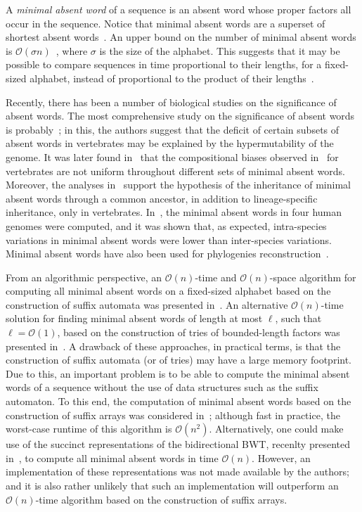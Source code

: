 \documentclass{llncs}
\newcommand{\cO}{\mathcal{O}}
\begin{document}
  A \textit{minimal absent word} of a sequence is an absent word whose proper factors all occur in the sequence.
  Notice that minimal absent words are a superset of shortest absent words~\cite{Pinho2009}. 
  An upper bound on the number of minimal absent words is $\cO(\sigma n)$~\cite{Crochemore98automataand,Mignosi02}, where $\sigma$ is the size of the alphabet.
  This suggests that it may be possible to compare sequences in time proportional to their lengths, for a fixed-sized alphabet, instead of proportional to
  the product of their lengths~\cite{HauboldPMW05}. 
  
  Recently, there has been a number of biological studies on the significance of absent words.
  The most comprehensive study on the significance of absent words is probably~\cite{nullrly}; in this, the authors suggest that the deficit of certain subsets of absent words 
  in vertebrates may be explained by the hypermutability of the genome. It was later found in~\cite{minabpro} that the compositional biases observed in~\cite{nullrly} for vertebrates 
  are not uniform throughout different sets of minimal absent words. Moreover, the analyses in~\cite{minabpro} support the hypothesis of the inheritance of minimal absent words through a common ancestor, 
  in addition to lineage-specific inheritance, only in vertebrates. In~\cite{citeulike:10180507}, the minimal absent words in four human genomes were computed, and it was shown that, as expected, 
  intra-species variations in minimal absent words were lower than inter-species variations. Minimal absent words have also been used for phylogenies reconstruction~\cite{Chairungsee2012109}.
  
  From an algorithmic perspective, an $\cO(n)$-time and $\cO(n)$-space algorithm for computing all minimal absent words on a fixed-sized alphabet based on the construction of suffix automata was presented 
  in~\cite{Crochemore98automataand}. An alternative $\cO(n)$-time solution for finding minimal absent words of length at most $\ell$, such that $\ell = \cO(1)$, based on the construction of tries of 
  bounded-length factors was presented in~\cite{Chairungsee2012109}. A drawback of these approaches, in practical terms, is that the construction of suffix automata (or of tries) 
  may have a large memory footprint. Due to this, an important problem is to be able to compute the minimal absent words of a sequence without the use of data structures such as the suffix automaton.
  To this end, the computation of minimal absent words based on the construction of suffix arrays was considered in~\cite{Pinho2009}; although fast in practice, the worst-case runtime of this algorithm is $\cO(n^2)$.
  Alternatively, one could make use of the succinct representations of the bidirectional BWT, recenlty presented in~\cite{Belazzougui2013}, to compute all minimal absent words in time $\cO(n)$.
  However, an implementation of these representations was not made available by the authors; and it is also rather unlikely that such an implementation will outperform an $\cO(n)$-time algorithm based on
  the construction of suffix arrays.
\end{document}
